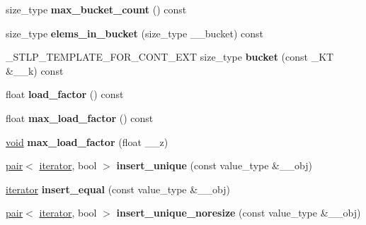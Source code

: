 \begin{DoxyCompactItemize}
\item 
\mbox{\label{classhashtable_a8a7714cabd613c8696f3697b9c9c8fb9}} 
size\+\_\+type {\bfseries max\+\_\+bucket\+\_\+count} () const
\item 
\mbox{\label{classhashtable_ac050145d008edd4034dc566eb098301e}} 
size\+\_\+type {\bfseries elems\+\_\+in\+\_\+bucket} (size\+\_\+type \+\_\+\+\_\+bucket) const
\item 
\mbox{\label{classhashtable_ae2bf062955dc04974a28b25f5eeac2ee}} 
\+\_\+\+S\+T\+L\+P\+\_\+\+T\+E\+M\+P\+L\+A\+T\+E\+\_\+\+F\+O\+R\+\_\+\+C\+O\+N\+T\+\_\+\+E\+XT size\+\_\+type {\bfseries bucket} (const \+\_\+\+KT \&\+\_\+\+\_\+k) const
\item 
\mbox{\label{classhashtable_ad8a5a06468ea64c1ab3f15e05e904526}} 
float {\bfseries load\+\_\+factor} () const
\item 
\mbox{\label{classhashtable_a893d654bd3fb35ee04f4d295b28b4486}} 
float {\bfseries max\+\_\+load\+\_\+factor} () const
\item 
\mbox{\label{classhashtable_a50e0c6b31d67dac674cc64561c767e47}} 
\hyperlink{interfacevoid}{void} {\bfseries max\+\_\+load\+\_\+factor} (float \+\_\+\+\_\+z)
\item 
\mbox{\label{classhashtable_a3001b32bbe1999b16e7b2b7c1890ac79}} 
\hyperlink{structpair}{pair}$<$ \hyperlink{structiterator}{iterator}, bool $>$ {\bfseries insert\+\_\+unique} (const value\+\_\+type \&\+\_\+\+\_\+obj)
\item 
\mbox{\label{classhashtable_a5a694e9d853644b71654e0b0a82a2246}} 
\hyperlink{structiterator}{iterator} {\bfseries insert\+\_\+equal} (const value\+\_\+type \&\+\_\+\+\_\+obj)
\item 
\mbox{\label{classhashtable_afc1fcb6e5ba4fbb0dff5bb49029cc046}} 
\hyperlink{structpair}{pair}$<$ \hyperlink{structiterator}{iterator}, bool $>$ {\bfseries insert\+\_\+unique\+\_\+noresize} (const value\+\_\+type \&\+\_\+\+\_\+obj)
\item 
\mbox{\label{classhashtable_a6f7e6b7ba3b550dd13105fbfac78ce3e}} 

\end{DoxyCompactItemize}
